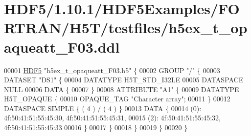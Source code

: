 \hypertarget{_h_d_f5_21_810_81_2_h_d_f5_examples_2_f_o_r_t_r_a_n_2_h5_t_2testfiles_2h5ex__t__opaqueatt___f03_8ddl_source}{}\section{H\+D\+F5/1.10.1/\+H\+D\+F5\+Examples/\+F\+O\+R\+T\+R\+A\+N/\+H5\+T/testfiles/h5ex\+\_\+t\+\_\+opaqueatt\+\_\+\+F03.ddl}
\label{_h_d_f5_21_810_81_2_h_d_f5_examples_2_f_o_r_t_r_a_n_2_h5_t_2testfiles_2h5ex__t__opaqueatt___f03_8ddl_source}

\begin{DoxyCode}
00001 \hyperlink{namespace_h_d_f5}{HDF5} \textcolor{stringliteral}{"h5ex\_t\_opaqueatt\_F03.h5"} \{
00002 GROUP \textcolor{stringliteral}{"/"} \{
00003    DATASET \textcolor{stringliteral}{"DS1"} \{
00004       DATATYPE  H5T\_STD\_I32LE
00005       DATASPACE  NULL
00006       DATA \{
00007       \}
00008       ATTRIBUTE \textcolor{stringliteral}{"A1"} \{
00009          DATATYPE  H5T\_OPAQUE \{
00010             OPAQUE\_TAG \textcolor{stringliteral}{"Character array"};
00011          \}
00012          DATASPACE  SIMPLE \{ ( 4 ) / ( 4 ) \}
00013          DATA \{
00014          (0): 4f:50:41:51:55:45:30, 4f:50:41:51:55:45:31,
00015          (2): 4f:50:41:51:55:45:32, 4f:50:41:51:55:45:33
00016          \}
00017       \}
00018    \}
00019 \}
00020 \}
\end{DoxyCode}
